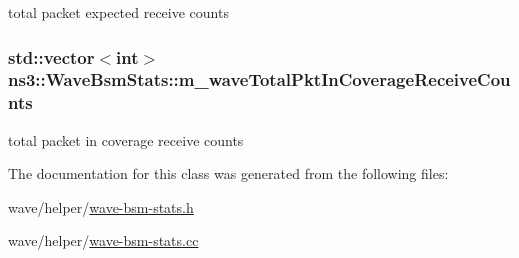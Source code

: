 total packet expected receive counts 

\subsubsection[{\texorpdfstring{m\+\_\+wave\+Total\+Pkt\+In\+Coverage\+Receive\+Counts}{m_waveTotalPktInCoverageReceiveCounts}}]{\setlength{\rightskip}{0pt plus 5cm}std\+::vector$<$int$>$ ns3\+::\+Wave\+Bsm\+Stats\+::m\+\_\+wave\+Total\+Pkt\+In\+Coverage\+Receive\+Counts\hspace{0.3cm}{\ttfamily [private]}}\hypertarget{classns3_1_1WaveBsmStats_a2dea853238532bae2f1ea0810848a79e}{}\label{classns3_1_1WaveBsmStats_a2dea853238532bae2f1ea0810848a79e}


total packet in coverage receive counts 



The documentation for this class was generated from the following files\+:\begin{DoxyCompactItemize}
\item 
wave/helper/\hyperlink{wave-bsm-stats_8h}{wave-\/bsm-\/stats.\+h}\item 
wave/helper/\hyperlink{wave-bsm-stats_8cc}{wave-\/bsm-\/stats.\+cc}\end{DoxyCompactItemize}
